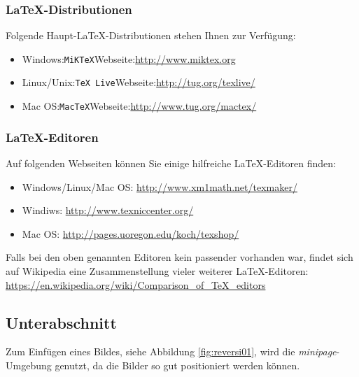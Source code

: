 \documentclass[12pt,a4paper,bibliography=totocnumbered,listof=totocnumbered]{scrartcl}
\begin{document}
    \subsubsection{\LaTeX-Distributionen}
    Folgende Haupt-\LaTeX-Distributionen stehen Ihnen zur Verfügung:
    \begin{itemize}
        \item Windows:\quad \texttt{MiKTeX}\quad Webseite:\quad\url{http://www.miktex.org}
        \item Linux/Unix:\quad \texttt{TeX Live}\quad Webseite:\quad\url{http://tug.org/texlive/}
        \item Mac OS:\quad \texttt{MacTeX}\quad Webseite:\quad\url{http://www.tug.org/mactex/}
    \end{itemize}

    \subsubsection{\LaTeX-Editoren}
    Auf folgenden Webseiten können Sie einige hilfreiche \LaTeX-Editoren finden:
    \begin{itemize}
        \item Windows/Linux/Mac OS: \url{http://www.xm1math.net/texmaker/}
        \item Windiws: \url{http://www.texniccenter.org/}
        \item Mac OS: \url{http://pages.uoregon.edu/koch/texshop/}
    \end{itemize}

    Falls bei den oben genannten Editoren kein passender vorhanden war, findet sich auf Wikipedia eine Zusammenstellung vieler weiterer \LaTeX-Editoren:\\[1em]
    \hspace*{3cm}\url{https://en.wikipedia.org/wiki/Comparison_of_TeX_editors}


    \subsection{Unterabschnitt}
    Zum Einfügen eines Bildes, siehe Abbildung \ref{fig:reversi01}, wird die \textit{minipage}-Umgebung genutzt, da die Bilder so gut positioniert werden können.
\end{document}
